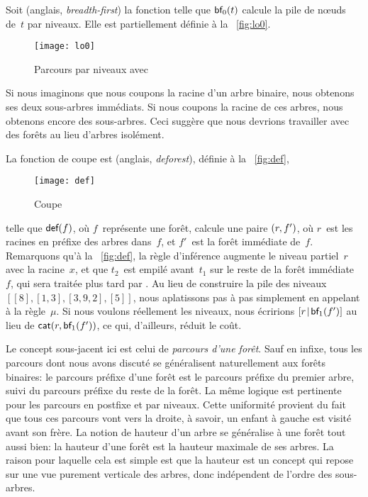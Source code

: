 Soit  (anglais,
\emph{breadth-first}) la fonction telle que \(\textsf{bf}_0(t)\)
calcule la pile de nœuds de~\(t\) par niveaux. Elle est
partiellement définie à la \fig~\vref{fig:lo0}.
\begin{figure}[t]
\centering
\texttt{[image: lo0]}
\caption{Parcours par niveaux avec }
\label{fig:lo0}
\end{figure}
Si nous imaginons que nous coupons la racine d'un arbre binaire, nous
obtenons ses deux sous-arbres immédiats. Si nous coupons la racine de
ces arbres, nous obtenons encore des sous-arbres. Ceci suggère que
nous devrions travailler avec des forêts au lieu
d'arbres isolément.

La fonction de coupe est 
(anglais, \emph{deforest}), définie à la \fig~\vref{fig:def},
\begin{figure}
\abovedisplayskip=0pt
\belowdisplayskip=0pt
\centering
\texttt{[image: def]}
\caption{Coupe}
\label{fig:def}
\end{figure}
telle que \(\textsf{def}(f)\), où \(f\)~représente une forêt, calcule une
paire \(({r},{f'})\), où \(r\)~est les racines en préfixe des arbres
dans~\(f\), et \(f'\)~est la forêt immédiate de~\(f\). Remarquons qu'à
la \fig~\vref{fig:def}, la règle d'inférence augmente le niveau
partiel~\(r\) avec la racine~\(x\), et que \(t_2\)~est empilé
avant~\(t_1\) sur le reste de la forêt immédiate~\(f\), qui sera
traitée plus tard par . Au
lieu de construire la pile des niveaux \([[8], [1,3], [3,9,2], [5]]\),
nous aplatissons pas à pas simplement en appelant
 à la règle~\(\mu\). Si nous voulons
réellement les niveaux, nous écririons
\([{r}\!\mid\!{\textsf{bf}_1(f')}]\) au lieu de
\(\textsf{cat}(r,\textsf{bf}_1(f'))\), ce qui,
d'ailleurs, réduit le coût.

Le concept sous-jacent ici est celui de \emph{parcours d'une
  forêt}. Sauf en infixe, tous les parcours dont nous avons discuté se
généralisent naturellement aux forêts binaires: le parcours préfixe
d'une forêt est le parcours préfixe du premier arbre, suivi du
parcours préfixe du reste de la forêt. La même logique est pertinente
pour les parcours en postfixe et par niveaux. Cette uniformité
provient du fait que tous ces parcours vont vers la droite, à savoir,
un enfant à gauche est visité avant son frère. La notion de
hauteur d'un arbre se généralise à une forêt tout
aussi bien: la hauteur d'une forêt est la hauteur maximale de ses
arbres. La raison pour laquelle cela est simple est que la hauteur est
un concept qui repose sur une vue purement verticale des arbres, donc
indépendent de l'ordre des sous-arbres.

